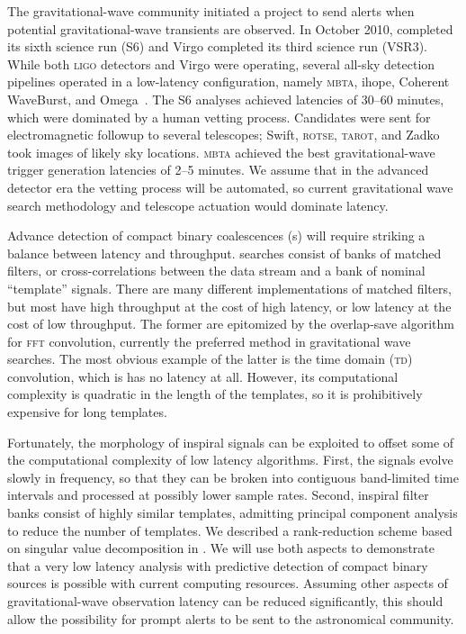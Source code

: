  The gravitational-wave community
initiated a project to send alerts when potential gravitational-wave transients
are observed.  In October 2010, \LIGO{} completed its sixth science run
(S6) and Virgo completed its third science run (VSR3).  While both
\textsc{ligo} detectors and Virgo were operating, several all-sky detection
pipelines operated in a low-latency configuration, namely \textsc{mbta}, ihope,
Coherent WaveBurst, and Omega~\cite{HugheyGWPAW2011, S6lowlatency}.
 The S6 analyses
achieved latencies of 30--60 minutes, which were dominated by a human vetting
process. Candidates were sent for electromagnetic followup to several
telescopes; Swift, \textsc{rotse}, \textsc{tarot}, and Zadko~\cite{kanner2008,
HugheyGWPAW2011} took images of likely sky locations.  \textsc{mbta} achieved
the best gravitational-wave trigger generation latencies of 2--5 minutes.  We
assume that in the advanced detector era the vetting process will be automated,
so current gravitational wave search methodology and telescope actuation would
dominate latency.

Advance detection of compact binary coalescences (\CBC{}s) will require striking a balance between latency
and throughput.  \CBC{} searches consist of banks of matched filters, or
cross-correlations between the data stream and a bank of nominal ``template''
signals.  There are many different implementations of matched filters, but most
have high throughput at the cost of high latency, or low latency at the cost of
low throughput.  The former are epitomized by the overlap-save algorithm for
\textsc{fft} convolution, currently the preferred method in gravitational wave
searches.  The most obvious example of the latter is the time domain
(\textsc{td}) convolution, which is has no latency at all.  However, its
computational complexity is quadratic in the length of the templates, so it is
prohibitively expensive for long templates.

Fortunately, the morphology of inspiral signals can be exploited to offset some
of the computational complexity of low latency algorithms.  First, the signals
evolve slowly in frequency, so that they can be broken into contiguous
band-limited time intervals and processed at possibly lower sample rates.
Second, inspiral filter banks consist of highly similar templates, admitting
principal component analysis to reduce the number of templates.  We described a
rank-reduction scheme based on singular value decomposition in
\cite{Cannon:2010p10398}.  We will use both aspects to demonstrate that a very
low latency analysis with predictive detection of compact binary sources is
possible with current computing resources.  Assuming other aspects of
gravitational-wave observation latency can be reduced significantly, this
should allow the possibility for prompt alerts to be sent to the astronomical
community.

